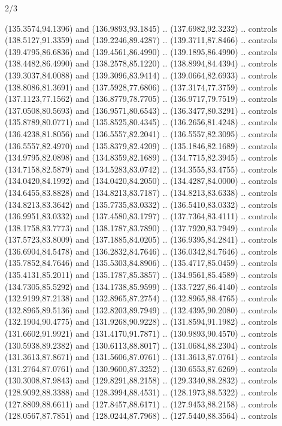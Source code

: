 \begin{flagdescription}{2/3}
\begin{scope}[xshift=0.5\flaglength,yshift=0.5\flagwidth,scale=\flagwidth/180]
\begin{scope}[y=0.8pt, x=0.8pt, yscale=-1,shift={(-168.75,-108.75)}]
  (135.3574,94.1396) and (136.9893,93.1845) .. (137.6982,92.3232) .. controls
  (138.5127,91.3359) and (139.2246,89.4287) .. (139.3711,87.8466) .. controls
  (139.4795,86.6836) and (139.4561,86.4990) .. (139.1895,86.4990) .. controls
  (138.4482,86.4990) and (138.2578,85.1220) .. (138.8994,84.4394) .. controls
  (139.3037,84.0088) and (139.3096,83.9414) .. (139.0664,82.6933) .. controls
  (138.8086,81.3691) and (137.5928,77.6806) .. (137.3174,77.3759) .. controls
  (137.1123,77.1562) and (136.8779,78.7705) .. (136.9717,79.7519) .. controls
  (137.0508,80.5693) and (136.9571,80.6543) .. (136.3477,80.3291) .. controls
  (135.8789,80.0771) and (135.8525,80.4345) .. (136.2656,81.4248) .. controls
  (136.4238,81.8056) and (136.5557,82.2041) .. (136.5557,82.3095) .. controls
  (136.5557,82.4970) and (135.8379,82.4209) .. (135.1846,82.1689) .. controls
  (134.9795,82.0898) and (134.8359,82.1689) .. (134.7715,82.3945) .. controls
  (134.7158,82.5879) and (134.5283,83.0742) .. (134.3555,83.4755) .. controls
  (134.0420,84.1992) and (134.0420,84.2050) .. (134.4287,84.0000) .. controls
  (134.6455,83.8828) and (134.8213,83.7187) .. (134.8213,83.6338) .. controls
  (134.8213,83.3642) and (135.7735,83.0332) .. (136.5410,83.0332) .. controls
  (136.9951,83.0332) and (137.4580,83.1797) .. (137.7364,83.4111) .. controls
  (138.1758,83.7773) and (138.1787,83.7890) .. (137.7920,83.7949) .. controls
  (137.5723,83.8009) and (137.1885,84.0205) .. (136.9395,84.2841) .. controls
  (136.6904,84.5478) and (136.2832,84.7646) .. (136.0342,84.7646) .. controls
  (135.7852,84.7646) and (135.5303,84.8906) .. (135.4717,85.0459) .. controls
  (135.4131,85.2011) and (135.1787,85.3857) .. (134.9561,85.4589) .. controls
  (134.7305,85.5292) and (134.1738,85.9599) .. (133.7227,86.4140) .. controls
  (132.9199,87.2138) and (132.8965,87.2754) .. (132.8965,88.4765) .. controls
  (132.8965,89.5136) and (132.8203,89.7949) .. (132.4395,90.2080) .. controls
  (132.1904,90.4775) and (131.9268,90.9228) .. (131.8594,91.1982) .. controls
  (131.6602,91.9921) and (131.4170,91.7871) .. (130.9893,90.4570) .. controls
  (130.5938,89.2382) and (130.6113,88.8017) .. (131.0684,88.2304) .. controls
  (131.3613,87.8671) and (131.5606,87.0761) .. (131.3613,87.0761) .. controls
  (131.2764,87.0761) and (130.9600,87.3252) .. (130.6553,87.6269) .. controls
  (130.3008,87.9843) and (129.8291,88.2158) .. (129.3340,88.2832) .. controls
  (128.9092,88.3388) and (128.3994,88.4531) .. (128.1973,88.5322) .. controls
  (127.8809,88.6611) and (127.8457,88.6171) .. (127.9453,88.2158) .. controls
  (128.0567,87.7851) and (128.0244,87.7968) .. (127.5440,88.3564) .. controls

\end{scope}
\end{scope}
\end{flagdescription}
